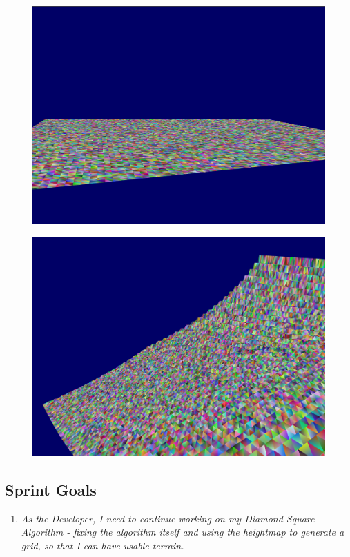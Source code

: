 \documentclass[a4paper,10pt]{report}
\begin{document}
\begin{figure}[h!]
\centering
\begin{minipage}{.5\textwidth}
  \centering
  \includegraphics[width=.9\linewidth]{Images/Sprint-Images/Sprint3-2.png}
  \label{fig:sprint3-2}
\end{minipage}%
\begin{minipage}{.5\textwidth}
  \centering
  \includegraphics[width=.9\linewidth]{Images/Sprint-Images/Sprint3-3.png}
  \label{fig:sprint3-3}
\end{minipage}
\end{figure}

\subsection{Sprint Goals}
\begin{enumerate}
    \item \textit{As the Developer, I need to continue working on my Diamond Square Algorithm - fixing the algorithm itself and using the heightmap to generate a grid, so that I can have usable terrain. }
\end{enumerate}
\end{document}
